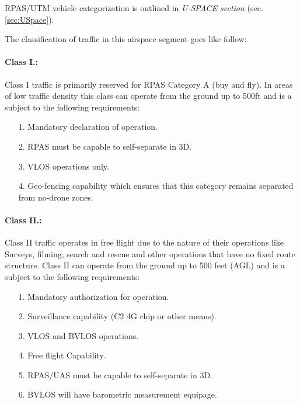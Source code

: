 \begin{note}
    RPAS/UTM vehicle categorization is outlined in \emph{U-SPACE section} (sec. \ref{sec:USpace}).
\end{note}

\noindent The classification of traffic in this airspace segment goes like follow:


\paragraph{Class I.:} Class I traffic is primarily reserved for RPAS Category A (buy and fly). In areas of low traffic density this class can operate from the ground up to 500ft and is a subject to the following requirements:
    \begin{itemize}
        \item[1.]  Mandatory declaration of operation.
        
        \item[2.]  RPAS must be capable to self-separate in 3D.
        
        \item[3.]  VLOS operations only.
        
        \item[4.]  Geo-fencing capability which ensures that this category remains separated from no-drone zones.
    \end{itemize}
    
\paragraph{Class II.:} Class II traffic operates in free flight due to the nature of their operations like Surveys, filming, search and rescue and other operations that have no fixed route structure. Class II can operate from the ground up to 500 feet (AGL) and is a subject to the following requirements:
    \begin{itemize}
        \item[1.] Mandatory authorization for operation.
        
        \item[2.] Surveillance capability (C2 4G chip or other means).
        
        \item[3.] VLOS and BVLOS operations.
        
        \item[4.]  Free flight Capability.
        
        \item[5.]  RPAS/UAS must be capable to self-separate in 3D.
        
        \item[6.]  BVLOS will have barometric measurement equipage.
    \end{itemize}
    

